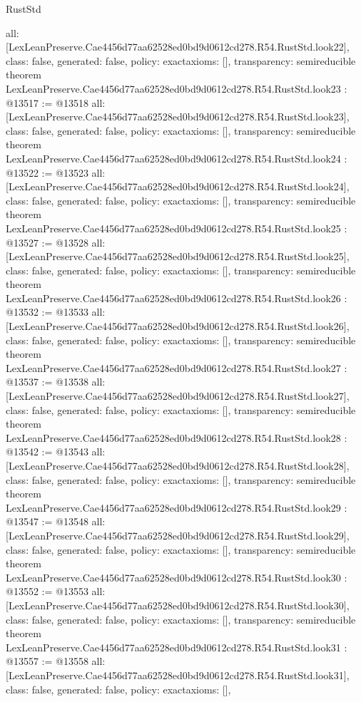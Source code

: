 \begin{lexlean}{RustStd}
\begin{coremodule}
{  all: [LexLeanPreserve.Cae4456d77aa62528ed0bd9d0612cd278.R54.RustStd.look22],
  class: false,
  generated: false,
  policy: exact{axioms: []},
  transparency: semireducible
}
theorem LexLeanPreserve.Cae4456d77aa62528ed0bd9d0612cd278.R54.RustStd.look23 : @13517 := @13518 {
  all: [LexLeanPreserve.Cae4456d77aa62528ed0bd9d0612cd278.R54.RustStd.look23],
  class: false,
  generated: false,
  policy: exact{axioms: []},
  transparency: semireducible
}
theorem LexLeanPreserve.Cae4456d77aa62528ed0bd9d0612cd278.R54.RustStd.look24 : @13522 := @13523 {
  all: [LexLeanPreserve.Cae4456d77aa62528ed0bd9d0612cd278.R54.RustStd.look24],
  class: false,
  generated: false,
  policy: exact{axioms: []},
  transparency: semireducible
}
theorem LexLeanPreserve.Cae4456d77aa62528ed0bd9d0612cd278.R54.RustStd.look25 : @13527 := @13528 {
  all: [LexLeanPreserve.Cae4456d77aa62528ed0bd9d0612cd278.R54.RustStd.look25],
  class: false,
  generated: false,
  policy: exact{axioms: []},
  transparency: semireducible
}
theorem LexLeanPreserve.Cae4456d77aa62528ed0bd9d0612cd278.R54.RustStd.look26 : @13532 := @13533 {
  all: [LexLeanPreserve.Cae4456d77aa62528ed0bd9d0612cd278.R54.RustStd.look26],
  class: false,
  generated: false,
  policy: exact{axioms: []},
  transparency: semireducible
}
theorem LexLeanPreserve.Cae4456d77aa62528ed0bd9d0612cd278.R54.RustStd.look27 : @13537 := @13538 {
  all: [LexLeanPreserve.Cae4456d77aa62528ed0bd9d0612cd278.R54.RustStd.look27],
  class: false,
  generated: false,
  policy: exact{axioms: []},
  transparency: semireducible
}
theorem LexLeanPreserve.Cae4456d77aa62528ed0bd9d0612cd278.R54.RustStd.look28 : @13542 := @13543 {
  all: [LexLeanPreserve.Cae4456d77aa62528ed0bd9d0612cd278.R54.RustStd.look28],
  class: false,
  generated: false,
  policy: exact{axioms: []},
  transparency: semireducible
}
theorem LexLeanPreserve.Cae4456d77aa62528ed0bd9d0612cd278.R54.RustStd.look29 : @13547 := @13548 {
  all: [LexLeanPreserve.Cae4456d77aa62528ed0bd9d0612cd278.R54.RustStd.look29],
  class: false,
  generated: false,
  policy: exact{axioms: []},
  transparency: semireducible
}
theorem LexLeanPreserve.Cae4456d77aa62528ed0bd9d0612cd278.R54.RustStd.look30 : @13552 := @13553 {
  all: [LexLeanPreserve.Cae4456d77aa62528ed0bd9d0612cd278.R54.RustStd.look30],
  class: false,
  generated: false,
  policy: exact{axioms: []},
  transparency: semireducible
}
theorem LexLeanPreserve.Cae4456d77aa62528ed0bd9d0612cd278.R54.RustStd.look31 : @13557 := @13558 {
  all: [LexLeanPreserve.Cae4456d77aa62528ed0bd9d0612cd278.R54.RustStd.look31],
  class: false,
  generated: false,
  policy: exact{axioms: []},
}
\end{coremodule}
\end{lexlean}
